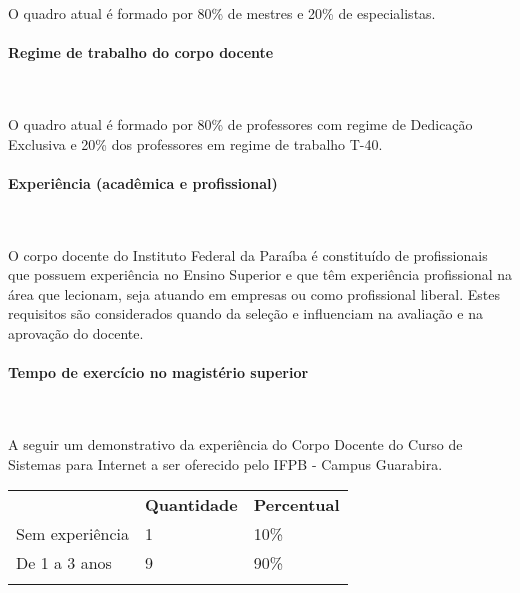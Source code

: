 	O quadro atual \'e formado por 80\% de mestres e 20\% de especialistas.

\paragraph{Regime de trabalho do corpo docente}\

	O quadro atual \'e formado por 80\% de professores com regime de Dedica\c{c}\~ao Exclusiva e 20\% dos professores em regime de trabalho T-40.

\paragraph{Experi\^encia (acad\^emica e profissional)}\

	O corpo docente do Instituto Federal da Paraíba é constituído de profissionais que possuem experiência no Ensino Superior e que têm experiência profissional na área que lecionam, seja atuando em empresas ou como profissional liberal. Estes requisitos são considerados quando da seleção e influenciam na avaliação e na aprovação do docente.

\paragraph{Tempo de exercício no magistério superior}\

A seguir um demonstrativo da experiência do Corpo Docente do Curso de Sistemas para Internet a ser oferecido pelo IFPB - Campus Guarabira.

\begin{table}[h]
\begin{tabular}{lll}
\rowcolor[HTML]{C0C0C0} 
\multicolumn{1}{c}{\cellcolor[HTML]{C0C0C0}\textbf{Experiência no Magistério Superior}} & \multicolumn{1}{c}{\cellcolor[HTML]{C0C0C0}\textbf{Quantidade}} & \multicolumn{1}{c}{\cellcolor[HTML]{C0C0C0}\textbf{Percentual}} \\
Sem experiência                                                                         & 1                                                               & 10\%                                                            \\
De 1 a 3 anos                                                                           & 9                                                               & 90\%                                                            \\
\rowcolor[HTML]{9B9B9B} 
\multicolumn{3}{l}{\cellcolor[HTML]{9B9B9B}}                                                                                                                                                                               
\end{tabular}
\end{table}

